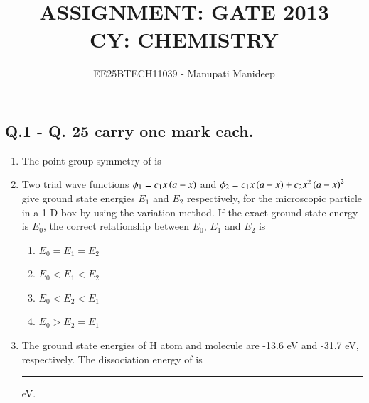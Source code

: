 \documentclass[journal,12pt,onecolumn]{IEEEtran}
\theoremstyle{remark}
\begin{document}
\title{
ASSIGNMENT: GATE 2013 \\
CY: CHEMISTRY}
\author{EE25BTECH11039 - Manupati Manideep}
\maketitle
\renewcommand{\thefigure}{\theenumi}
\renewcommand{\thetable}{\theenumi}
\begin{center}
\section*{Q.1 - Q. 25 carry one mark each.}

\end{center}

\begin{enumerate}

\item The point group symmetry of  is
    \begin{enumerate}
      \hfill{}
    \end{enumerate}



\item Two trial wave functions $\phi_{1}=c_{1}x\left(a-x\right)$ and $\phi_{2}=c_{1}x\left(a-x\right)+c_{2}x^{2}\left(a-x\right)^{2}$ give ground state energies $E_{1}$ and $E_{2}$ respectively, for the microscopic particle in a 1-D box by using the variation method. If the exact ground state energy is $E_{0}$, the correct relationship between $E_{0}$, $E_{1}$ and $E_{2}$ is
    \begin{enumerate}
        \item $E_{0}=E_{1}=E_{2}$
        \item $E_{0}<E_{1}<E_{2}$
        \item $E_{0}<E_{2}<E_{1}$
        \item $E_{0}>E_{2}=E_{1}$
        \hfill{}
    \end{enumerate}



\item The ground state energies of H atom and  molecule are -13.6 eV and -31.7 eV, respectively. The dissociation energy of  is \rule{1cm}{0.15mm} eV.
\hfill{}




\end{enumerate}
\end{document}
